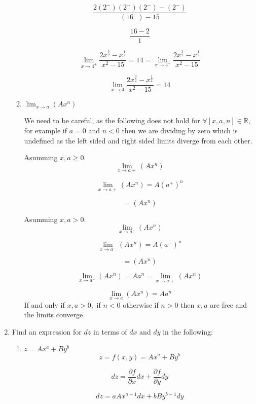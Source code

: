 \documentclass[12pt]{article}
\newcounter{ques}
\newenvironment{question}{\stepcounter{ques}{\noindent\bf Question \arabic{ques}:}}{\vspace{5mm}}
\begin{document}
\begin{question}
\begin{enumerate}[label=(\alph*)]
\begin{enumerate}[label=(\alph*)]
            $$
            \frac{2(2^-)(2^-)(2^-) - (2^-)}{(16^-) - 15}
            $$

            $$
            \frac{16 - 2}{1}
            $$

            $$
            \lim_{x \to 4^+} \frac{2x^{\frac{3}{2}} - x^{\frac{1}{2}}}{x^2 - 15} = 14 = 
            \lim_{x \to 4^-} \frac{2x^{\frac{3}{2}} - x^{\frac{1}{2}}}{x^2 - 15}
            $$

            $$\lim_{x \to 4} \frac{2x^{\frac{3}{2}} - x^{\frac{1}{2}}}{x^2 - 15} = 14$$
      
            \item $\lim_{x \to a}(A x^n)$
            
            We need to be careful, as the following does not hold for $ \forall [x, a, n] \in \mathbb{R}$, for example 
            if $a = 0$ and $n < 0$ then we are dividing by zero which is undefined as the left sided and right sided limits diverge from each other.

            Asumming $ x, a \geq 0$.
            $$\lim_{x \to a+}(A x^n)$$

            $$\lim_{x \to a+}(A x^n) = A (a^+)^n$$


            $$ = (A x^n) $$

            Asumming $ x, a > 0$.
            $$\lim_{x \to a^-}(A x^n)$$

            $$\lim_{x \to a^-}(A x^n) = A (a^-)^n$$

            $$ = (A x^n) $$

            $$\lim_{x \to a^-}(A x^n) = A a^n = \lim_{x \to a+}(A x^n)$$

            $$\lim_{x \to a}(A x^n) = A a^n$$ If and only if $ x, a > 0, $ if $n < 0$ otherwise if $n > 0$ then $x, a$ are free and the limits converge.

      \end{enumerate}


      \item Find an expression for $dz$ in terms of $dx$ and $dy$ in the following:
      \begin{enumerate}[label=(\alph*)]
            \item $z = Ax^a + By^b$
            $$z = f(x,y) = Ax^a + By^b$$

            $$ dz = \frac{\partial f}{\partial x} dx + \frac{\partial f}{\partial y} dy$$

            $$ dz = aAx^{a-1} dx +  bBy^{b-1} dy$$



\end{enumerate}
\end{enumerate}
\end{question}
\end{document}
